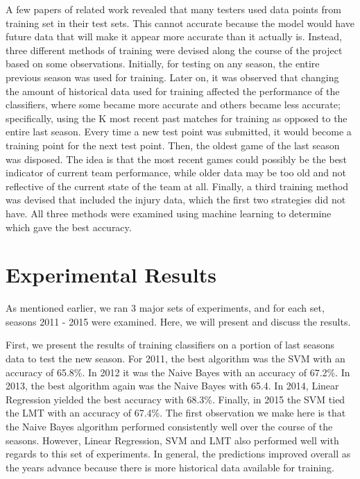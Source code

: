 \documentclass{article}
\begin{document}
A few papers of related work revealed that many testers used data points from training set in their test sets. This cannot accurate because the model would have future data that will make it appear more accurate than it actually is. Instead, three different methods of training were devised along the course of the project based on some observations. Initially, for testing on any season, the entire previous season was used for training. Later on, it was observed that changing the amount of historical data used for training affected the performance of the classifiers, where some became more accurate and others became less accurate; specifically, using the K most recent past matches for training as opposed to the entire last season. Every time a new test point was submitted, it would become a training point for the next test point. Then, the oldest game of the last season was disposed. The idea is that the most recent games could possibly be the best indicator of current team performance, while older data may be too old and not reflective of the current state of the team at all. Finally, a third training method was devised that included the injury data, which the first two strategies did not have. All three methods were examined using machine learning to determine which gave the best accuracy. 

\section{Experimental Results}

As mentioned earlier, we ran 3 major sets of experiments, and for each set, seasons 2011 - 2015 were examined. Here, we will present and discuss the results. 

First, we present the results of training classifiers on a portion of last seasons data to test the new season. For 2011, the best algorithm was the SVM with an accuracy of 65.8\%. In 2012 it was the Naive Bayes with an accuracy of 67.2\%. In 2013, the best algorithm again was the Naive Bayes with 65.4. In 2014, Linear Regression yielded the best accuracy with 68.3\%. Finally, in 2015 the SVM tied the LMT with an accuracy of 67.4\%. The first observation we make here is that the Naive Bayes algorithm performed consistently well over the course of the seasons. However, Linear Regression, SVM and LMT also performed well with regards to this set of experiments. In general, the predictions improved overall as the years advance because there is more historical data available for training.
\end{document}
